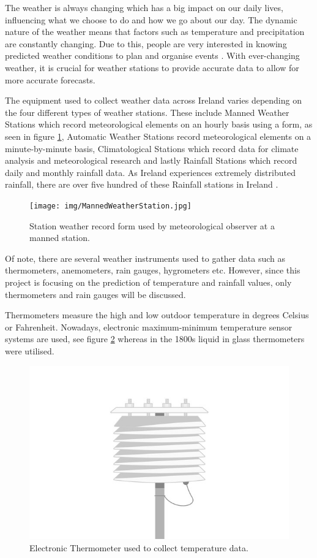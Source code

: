 The weather is always changing which has a big impact on our daily lives, influencing what we choose to do and how we go about our day. The dynamic nature of the weather means that factors such as temperature and precipitation are constantly changing. Due to this, people are very interested in knowing predicted weather conditions to plan and organise events \cite{WeatherontheGo}. With ever-changing weather, it is crucial for weather stations to provide accurate data to allow for more accurate forecasts. 

The equipment used to collect weather data across Ireland varies depending on the four different types of weather stations. These include Manned Weather Stations which record meteorological elements on an hourly basis using a form, as seen in figure \ref{MetForm}, Automatic Weather Stations record meteorological elements on a minute-by-minute basis, Climatological Stations which record data for climate analysis and meteorological research and lastly Rainfall Stations which record daily and monthly rainfall data. As Ireland experiences extremely distributed rainfall, there are over five hundred of these Rainfall stations in Ireland \cite{MET}.

\begin{figure}[h]
\centering
\texttt{[image: img/MannedWeatherStation.jpg]}
\caption{Station weather record form used by meteorological observer at a manned station. }
\label{MetForm}
\end{figure}
Of note, there are several weather instruments used to gather data such as thermometers, anemometers, rain gauges, hygrometers etc. However, since this project is focusing on the prediction of temperature and rainfall values, only thermometers and rain gauges will be discussed.

Thermometers measure the high and low outdoor temperature in degrees Celsius or Fahrenheit. Nowadays, electronic maximum-minimum temperature sensor systems are used, see figure \ref{Thermometer} whereas in the 1800s liquid in glass thermometers were utilised.\cite{WeatherInstruments}

\begin{figure}[h]
\centering
\includegraphics[scale=0.2]{img/MaxMinThermometer.jpg}
\caption{Electronic Thermometer used to collect temperature data.}
\label{Thermometer}
\end{figure}

